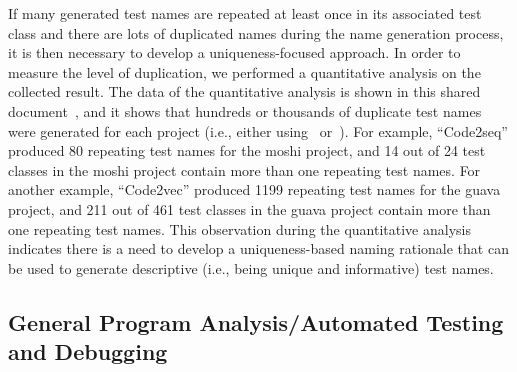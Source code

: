 If many generated test names are repeated at least once in its associated test class and there are lots of duplicated names during the name generation process, it is then necessary to develop a uniqueness-focused approach.
%
In order to measure the level of duplication, we performed a quantitative analysis on the collected result.
%
The data of the quantitative analysis is shown in this shared document~\cite{CodeResult}, and it shows that hundreds or thousands of duplicate test names were generated for each project (i.e., either using~\cite{alon2018code2seq} or~\cite{alon2019code2vec}).
%
For example, \enquote{Code2seq} produced \num{80} repeating test names for the moshi project, and \num{14} out of \num{24} test classes in the moshi project contain more than one repeating test names.
%
For another example, \enquote{Code2vec} produced \num{1199} repeating test names for the guava project, and \num{211} out of \num{461} test classes in the guava project contain more than one repeating test names.
%
This observation during the quantitative analysis indicates there is a need to develop a uniqueness-based naming rationale that can be used to generate descriptive (i.e., being unique and informative) test names.


\subsection{General Program Analysis\slash Automated Testing and Debugging}

